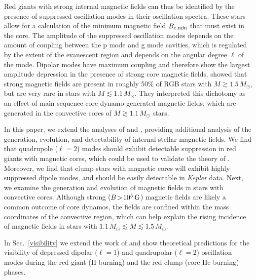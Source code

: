 Red giants with strong internal magnetic fields can thus be identified by the presence of suppressed oscillation modes in their oscillation spectra. These stars allow for a calculation of the minimum magnetic field $B_{c,{\rm min}}$ that must exist in the core. The amplitude of the suppressed oscillation modes depends on the amount of coupling between the p mode and g mode cavities, which is regulated by the extent of the evanescent region and depends on the angular degree $\ell$ of the mode. Dipolar modes have maximum coupling and therefore show the largest amplitude depression in the presence of strong core magnetic fields. \cite{Stello_2016} showed that strong magnetic fields are present in roughly 50\% of RGB stars with $M \gtrsim 1.5 \, M_\odot$, but are very rare in stars with $M \lesssim 1.1 \, M_\odot$. They interpreted this dichotomy as an effect of main sequence core dynamo-generated magnetic fields, which are generated in the convective cores of $M \gtrsim 1.1 \, M_\odot$ stars.

In this paper, we extend the analyses of \cite{Fuller_2015} and \cite{Stello_2016}, providing additional analysis of the generation, evolution, and detectability of internal stellar magnetic fields. We find that quadrupole ($\ell=2$) modes should exhibit detectable suppression in red giants with magnetic cores, which could be used to validate the theory of \cite{Fuller_2015}. Moreover, we find that clump stars with magnetic cores will exhibit highly suppressed dipole modes, and should be easily detectable in {\it Kepler} data. Next, we examine the generation and evolution of magnetic fields in stars with convective cores. Although strong ($B \! > \! 10^5 \, {\rm G}$) magnetic fields are likely a common outcome of core dynamos, the fields are confined within the mass coordinates of the convective region, which can help explain the rising incidence of magnetic fields in stars with $1.1 \, M_\odot \! \lesssim \! M \! \lesssim \! 1.5 \, M_\odot$. 

In Sec.~\ref{visibility} we extend the work of \citet{Fuller_2015} and show theoretical predictions for the visibility of depressed dipolar ($\ell=1$) and quadrupolar ($\ell=2$) oscillation modes during the red giant  (H-burning) and  the red clump (core He-burning) phases. 




  